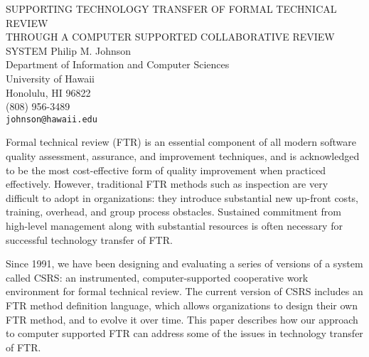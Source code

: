 


\pagestyle{empty}
\thispagestyle{empty}



\pagestyle{empty}
\thispagestyle{empty}

\makeieeetitle
  {SUPPORTING TECHNOLOGY TRANSFER OF FORMAL TECHNICAL REVIEW \\
   THROUGH A COMPUTER SUPPORTED COLLABORATIVE REVIEW SYSTEM}
  {Philip M. Johnson\\
   Department of Information and Computer Sciences\\
   University of Hawaii\\
   Honolulu, HI 96822\\
   (808) 956-3489\\
   {\tt johnson@hawaii.edu}}

   
   \makeieeeabstract 
   {

   Formal technical review (FTR) is an essential component of all
   modern software quality assessment, assurance, and improvement techniques,
   and is acknowledged to be the most cost-effective form of quality
   improvement when practiced effectively.  However, traditional FTR
   methods such as inspection are very difficult to adopt
   in organizations: they introduce substantial new up-front
   costs, training, overhead, and group process obstacles.  Sustained
   commitment from high-level management along with substantial
   resources is often necessary for successful technology transfer of
   FTR.
  
   Since 1991, we have been designing and evaluating a series of
   versions of a system called CSRS: an instrumented, computer-supported
   cooperative work environment for formal technical review.  The
   current version of CSRS includes an FTR method definition language,
   which allows organizations to design their own FTR method, and to
   evolve it over time. This paper describes how our approach to
   computer supported FTR can address some of the issues in technology
   transfer of FTR.

   }

